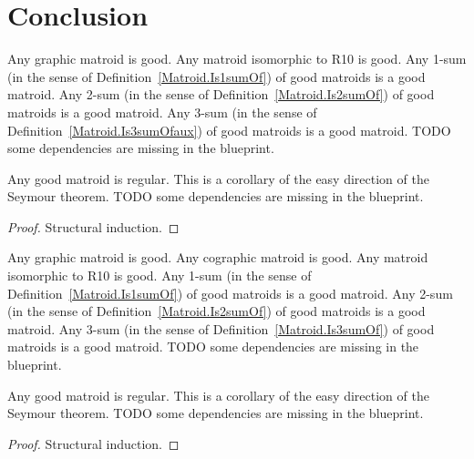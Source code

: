 \chapter{Conclusion}

\begin{definition}
    \label{Matroid.IsGoodaux}
    \leanok
    Any graphic matroid is good.
    Any matroid isomorphic to R10 is good.
    Any 1-sum (in the sense of Definition~\ref{Matroid.Is1sumOf}) of good matroids is a good matroid.
    Any 2-sum (in the sense of Definition~\ref{Matroid.Is2sumOf}) of good matroids is a good matroid.
    Any 3-sum (in the sense of Definition~\ref{Matroid.Is3sumOfaux}) of good matroids is a good matroid.
    TODO some dependencies are missing in the blueprint.
\end{definition}

\begin{corollary}
    \label{Matroid.IsGoodaux.isRegular}
    \leanok
    Any good matroid is regular. This is a corollary of the easy direction of the Seymour theorem.
    TODO some dependencies are missing in the blueprint.
\end{corollary}

\begin{proof}
    \leanok
    Structural induction.
\end{proof}

\begin{definition}
    \label{Matroid.IsGood}
    \leanok
    Any graphic matroid is good.
    Any cographic matroid is good.
    Any matroid isomorphic to R10 is good.
    Any 1-sum (in the sense of Definition~\ref{Matroid.Is1sumOf}) of good matroids is a good matroid.
    Any 2-sum (in the sense of Definition~\ref{Matroid.Is2sumOf}) of good matroids is a good matroid.
    Any 3-sum (in the sense of Definition~\ref{Matroid.Is3sumOf}) of good matroids is a good matroid.
    TODO some dependencies are missing in the blueprint.
\end{definition}

\begin{corollary}
    \label{Matroid.IsGood.isRegular}
    \leanok
    Any good matroid is regular. This is a corollary of the easy direction of the Seymour theorem.
    TODO some dependencies are missing in the blueprint.
\end{corollary}

\begin{proof}
    Structural induction.
\end{proof}
